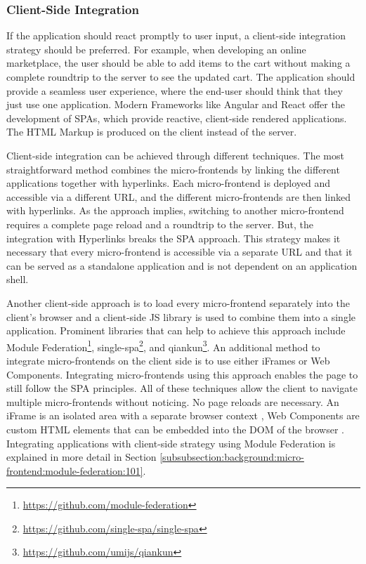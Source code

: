 \subsubsection{Client-Side Integration}\label{subsubsection:background:micro-frontend-architecture:integration-strategies:client-side-integration}

If the application should react promptly to user input, a client-side integration strategy should be preferred. For example, when developing an online marketplace, the user should be able to add items to the cart without making a complete roundtrip to the server to see the updated cart. The application should provide a seamless user experience, where the end-user should think that they just use one application. Modern Frameworks like Angular and React offer the development of \acp{SPA}, which provide reactive, client-side rendered applications. The \ac{HTML} Markup is produced on the client instead of the server. \cite{book:2020:geers:background:micro-frontends:micro-frontends-in-action}

\bigskip

\noindent Client-side integration can be achieved through different techniques. The most straightforward method combines the micro-frontends by linking the different applications together with hyperlinks. Each micro-frontend is deployed and accessible via a different \ac{URL}, and the different micro-frontends are then linked with hyperlinks. As the approach implies, switching to another micro-frontend requires a complete page reload and a roundtrip to the server. But, the integration with Hyperlinks breaks the \ac{SPA} approach. This strategy makes it necessary that every micro-frontend is accessible via a separate \ac{URL} and that it can be served as a standalone application and is not dependent on an application shell.

\bigskip

\noindent Another client-side approach is to load every micro-frontend separately into the client's browser and a client-side \ac{JS} library is used to combine them into a single application. Prominent libraries that can help to achieve this approach include Module Federation\footnote{\url{https://github.com/module-federation}}, single-spa\footnote{\url{https://github.com/single-spa/single-spa}}, and qiankun\footnote{\url{https://github.com/umijs/qiankun}}. An additional method to integrate micro-frontends on the client side is to use either iFrames or Web Components. Integrating micro-frontends using this approach enables the page to still follow the \ac{SPA} principles. All of these techniques allow the client to navigate multiple micro-frontends without noticing. No page reloads are necessary. An iFrame is an isolated area with a separate browser context \cite[35]{book:2020:geers:background:micro-frontends:micro-frontends-in-action}, Web Components are custom \ac{HTML} elements that can be embedded into the \ac{DOM} of the browser \cite[103]{book:2019:farrell:background:micro-frontends:web-components-in-action}. Integrating applications with client-side strategy using Module Federation is explained in more detail in Section \ref{subsubsection:background:micro-frontend:module-federation:101}.
